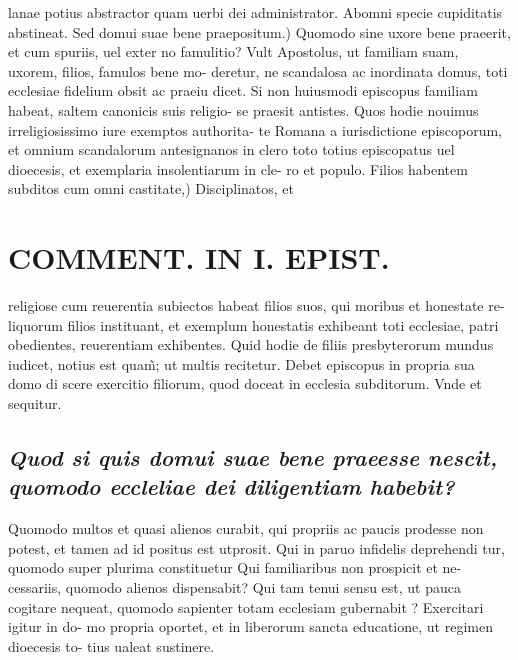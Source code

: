 \documentclass{article}
\begin{document}
\begin{pages}
lanae potius abstractor quam uerbi dei administrator. Abomni specie cupiditatis abstineat. Sed domui suae bene praepositum.) Quomodo sine uxore bene praeerit, et cum spuriis, uel exter no famulitio? Vult Apostolus, ut familiam suam, uxorem, filios, famulos bene mo- deretur, ne scandalosa ac inordinata domus, toti ecclesiae fidelium obsit ac praeiu dicet. Si non huiusmodi episcopus familiam habeat, saltem canonicis suis religio- se praesit antistes. Quos hodie nouimus irreligiosissimo iure exemptos authorita- te Romana a iurisdictione episcoporum, et omnium scandalorum antesignanos in clero toto totius episcopatus uel dioecesis, et exemplaria insolentiarum in cle- ro et populo. Filios habentem subditos cum omni castitate,) Disciplinatos, et  \pend
\section*{COMMENT. IN I. EPIST. }
\marginpar{[ p.498 ]}\pstart religiose cum reuerentia subiectos habeat filios suos, qui moribus et honestate re- liquorum filios instituant, et exemplum honestatis exhibeant toti ecclesiae, patri obedientes, reuerentiam exhibentes. Quid hodie de filiis presbyterorum mundus iudicet, notius est quam̃; ut multis recitetur. Debet episcopus in propria sua domo di scere exercitio filiorum, quod doceat in ecclesia subditorum. Vnde et sequitur.  \pend
{}
{}
\subsection*{\textit{Quod si quis domui suae bene praeesse nescit, quomodo eccleliae dei diligentiam habebit? }}\pstart Quomodo multos et quasi alienos curabit, qui propriis ac paucis prodesse non potest, et tamen ad id positus est utprosit. Qui in paruo infidelis deprehendi tur, quomodo super plurima constituetur Qui familiaribus non prospicit et ne- cessariis, quomodo alienos dispensabit? Qui tam tenui sensu est, ut pauca cogitare nequeat, quomodo sapienter totam ecclesiam gubernabit ? Exercitari igitur in do- mo propria oportet, et in liberorum sancta educatione, ut regimen dioecesis to- tius ualeat sustinere.  \pend
{}
{}

\end{pages}
\end{document}
